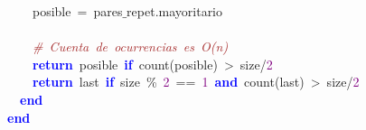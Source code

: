 \mbox{}\ \ \ \ posible\ \textcolor{BrickRed}{=}\ pares$\_$repet\textcolor{BrickRed}{.}mayoritario \\
\mbox{} \\
\mbox{}\ \ \ \ \textit{\textcolor{Brown}{\#\ Cuenta\ de\ ocurrencias\ es\ O(n)}} \\
\mbox{}\ \ \ \ \textbf{\textcolor{Blue}{return}}\ posible\ \textbf{\textcolor{Blue}{if}}\ count\textcolor{BrickRed}{(}posible\textcolor{BrickRed}{)}\ \textcolor{BrickRed}{\textgreater{}}\ size\textcolor{BrickRed}{/}\textcolor{Purple}{2} \\
\mbox{}\ \ \ \ \textbf{\textcolor{Blue}{return}}\ last\ \textbf{\textcolor{Blue}{if}}\ size\ \textcolor{BrickRed}{\%}\ \textcolor{Purple}{2}\ \textcolor{BrickRed}{==}\ \textcolor{Purple}{1}\ \textbf{\textcolor{Blue}{and}}\ count\textcolor{BrickRed}{(}last\textcolor{BrickRed}{)}\ \textcolor{BrickRed}{\textgreater{}}\ size\textcolor{BrickRed}{/}\textcolor{Purple}{2} \\
\mbox{}\ \ \textbf{\textcolor{Blue}{end}} \\
\mbox{}\textbf{\textcolor{Blue}{end}} \\
\mbox{} \\